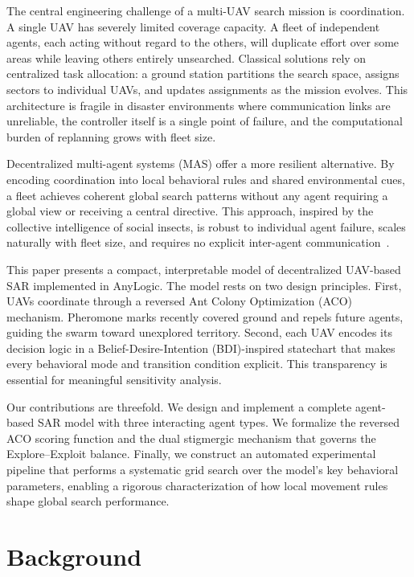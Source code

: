 \documentclass[10pt,a4paper,twocolumn]{article}
\begin{document}
The central engineering challenge of a multi-UAV search mission is coordination. A single UAV has severely limited coverage capacity. A fleet of independent agents, each acting without regard to the others, will duplicate effort over some areas while leaving others entirely unsearched. Classical solutions rely on centralized task allocation: a ground station partitions the search space, assigns sectors to individual UAVs, and updates assignments as the mission evolves. This architecture is fragile in disaster environments where communication links are unreliable, the controller itself is a single point of failure, and the computational burden of replanning grows with fleet size.

Decentralized multi-agent systems (MAS) offer a more resilient alternative. By encoding coordination into local behavioral rules and shared environmental cues, a fleet achieves coherent global search patterns without any agent requiring a global view or receiving a central directive. This approach, inspired by the collective intelligence of social insects, is robust to individual agent failure, scales naturally with fleet size, and requires no explicit inter-agent communication~\citep{bk:Bonabeau1999}.

This paper presents a compact, interpretable model of decentralized UAV-based SAR implemented in AnyLogic. The model rests on two design principles. First, UAVs coordinate through a reversed Ant Colony Optimization (ACO) mechanism. Pheromone marks recently covered ground and repels future agents, guiding the swarm toward unexplored territory. Second, each UAV encodes its decision logic in a Belief-Desire-Intention (BDI)-inspired statechart that makes every behavioral mode and transition condition explicit. This transparency is essential for meaningful sensitivity analysis.

Our contributions are threefold. We design and implement a complete agent-based SAR model with three interacting agent types. We formalize the reversed ACO scoring function and the dual stigmergic mechanism that governs the Explore--Exploit balance. Finally, we construct an automated experimental pipeline that performs a systematic grid search over the model's key behavioral parameters, enabling a rigorous characterization of how local movement rules shape global search performance.

\section{Background}
\end{document}
